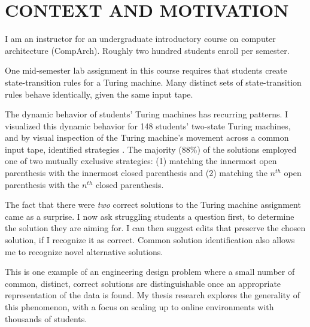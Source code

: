 \documentclass{sig-alternate-2013}
\begin{document}
\section{CONTEXT AND MOTIVATION}
I am an instructor for an undergraduate introductory course on computer architecture (CompArch). Roughly two hundred students enroll per semester. 

One mid-semester lab assignment in this course requires that students create state-transition rules for a Turing machine. %
Many distinct sets of state-transition rules behave identically, given the same input tape. %

The dynamic behavior of students' Turing machines has recurring patterns. I visualized this dynamic behavior for 148 students' two-state Turing machines, and by visual inspection of the Turing machine's movement across a common input tape, identified strategies \cite{ICERGlassman}. The majority (88\%) of the solutions employed one of two mutually exclusive strategies: (1) matching the innermost open parenthesis with the innermost closed parenthesis and (2) matching the $n^{th}$ open parenthesis with the $n^{th}$ closed parenthesis.

The fact that there were {\em two} correct solutions to the Turing machine assignment came as a surprise. I now ask struggling students a question first, to determine the solution they are aiming for. I can then suggest edits that preserve the chosen solution, if I recognize it as correct. Common solution identification also allows me to recognize novel alternative solutions.


This is one example of an engineering design problem where a small number of common, distinct, correct solutions are distinguishable once an appropriate representation of the data is found. My thesis research explores the generality of this phenomenon, with a focus on scaling up to online environments with thousands of students.
\end{document}
